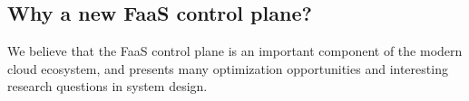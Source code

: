 \subsection{Why a new FaaS control plane?}

We believe that the FaaS control plane is an important component of the modern cloud ecosystem, and presents many optimization opportunities and interesting research questions in system design. 

